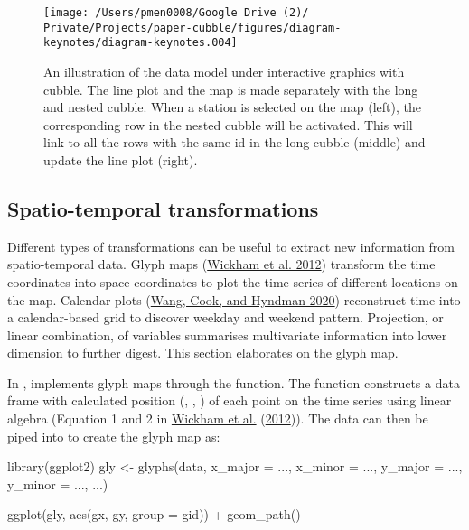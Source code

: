 \documentclass{article}
\newenvironment{Shaded}{\begin{snugshade}}{\end{snugshade}}
\newcommand{\AttributeTok}[1]{\textcolor[rgb]{0.77,0.63,0.00}{#1}}
\newcommand{\FunctionTok}[1]{\textcolor[rgb]{0.00,0.00,0.00}{#1}}
\newcommand{\NormalTok}[1]{#1}
\newcommand{\OtherTok}[1]{\textcolor[rgb]{0.56,0.35,0.01}{#1}}
\newcommand{\SpecialCharTok}[1]{\textcolor[rgb]{0.00,0.00,0.00}{#1}}
\begin{document}
\begin{figure}

{\centering \texttt{[image: /Users/pmen0008/Google Drive (2)/ Private/Projects/paper-cubble/figures/diagram-keynotes/diagram-keynotes.004]} 

}

\caption{An illustration of the data model under interactive graphics with cubble. The line plot and the map is made separately with the long and nested cubble. When a station is selected on the map (left), the corresponding row in the nested cubble will be activated. This will link to all the rows with the same id in the long cubble (middle) and update the line plot (right).}\label{fig:illu-interactive}
\end{figure}

\hypertarget{st_transformation}{%
\subsection{Spatio-temporal transformations}\label{st_transformation}}

Different types of transformations can be useful to extract new information from spatio-temporal data. Glyph maps (\protect\hyperlink{ref-Wickham2012-yr}{Wickham et al. 2012}) transform the time coordinates into space coordinates to plot the time series of different locations on the map. Calendar plots (\protect\hyperlink{ref-wang2020calendar}{Wang, Cook, and Hyndman 2020}) reconstruct time into a calendar-based grid to discover weekday and weekend pattern. Projection, or linear combination, of variables summarises multivariate information into lower dimension to further digest. This section elaborates on the glyph map.

In ,  implements glyph maps through the  function. The function constructs a data frame with calculated position (, , ) of each point on the time series using linear algebra (Equation 1 and 2 in \protect\hyperlink{ref-Wickham2012-yr}{Wickham et al.} (\protect\hyperlink{ref-Wickham2012-yr}{2012})). The data can then be piped into  to create the glyph map as:

\begin{Shaded}
\begin{Highlighting}[]
\FunctionTok{library}\NormalTok{(ggplot2)}
\NormalTok{gly }\OtherTok{\textless{}{-}} \FunctionTok{glyphs}\NormalTok{(data,}
              \AttributeTok{x\_major =}\NormalTok{ ..., }\AttributeTok{x\_minor =}\NormalTok{ ...,}
              \AttributeTok{y\_major =}\NormalTok{ ..., }\AttributeTok{y\_minor =}\NormalTok{ ..., ...)}

\FunctionTok{ggplot}\NormalTok{(gly, }\FunctionTok{aes}\NormalTok{(gx, gy, }\AttributeTok{group =}\NormalTok{ gid)) }\SpecialCharTok{+}
  \FunctionTok{geom\_path}\NormalTok{()}
\end{Highlighting}
\end{Shaded}
\end{document}
